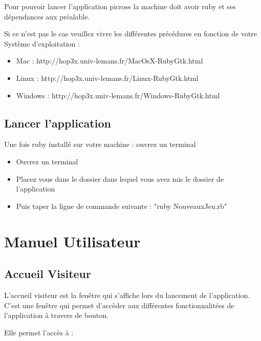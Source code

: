 \documentclass[11pt]{article}
\begin{document}
Pour pouvoir lancer l'application picross la machine doit avoir ruby et ses dépendances aux préalable.

Si ce n'est pas le cas veuillez vivre les différentes précédures en fonction de votre Système d'exploitation :

	\begin{itemize}
		\item Mac : http://hop3x.univ-lemans.fr/MacOsX-RubyGtk.html
		\item Linux : http://hop3x.univ-lemans.fr/Linux-RubyGtk.html
		\item Windows : http://hop3x.univ-lemans.fr/Windows-RubyGtk.html
	\end{itemize}

\subsection{Lancer l'application}

Une fois ruby installé sur votre machine : ouvrez un terminal
	
	\begin{itemize}
		\item Ouvrez un terminal
		\item Placez vous dans le dossier dans lequel vous avez mis le dossier de l'application
		\item Puis taper la ligne de commande suivante : "ruby NouveauxJeu.rb"
	\end{itemize}


\newpage


\section{Manuel Utilisateur}


\subsection{Accueil Visiteur}

L'accueil visiteur est la fenêtre qui s'affiche lors du lancement de l'application. C'est une fenêtre qui permet d'accèder aux différentes fonctionnalitées de l'application à travers de bouton.

Elle permet l'accès à :
\end{document}
